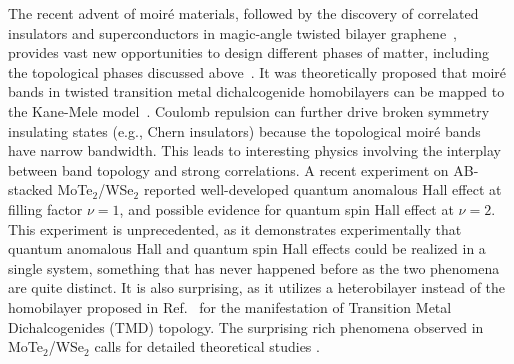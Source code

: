 \documentclass[aps,prl,twocolumn,superscriptaddress,longbibliography]{revtex4-2}
\begin{document}
The recent advent of moir\'e materials, followed by the discovery of correlated insulators and superconductors in magic-angle twisted bilayer graphene~\cite{cao2018correlated,cao2018unconventional}, provides vast new opportunities to design different phases of matter, including the topological phases discussed above~\cite{yankowitz2019tuning,chen2019evidence,cao2020tunable,chen2020electrically,wong2020cascade,serlin2020intrinsic,sharpe2019emergent,lu2019superconductors,shen2020correlated,choi2019electronic,xie2019spectroscopic,chen2019signatures,chen2020tunable,liu2020tunable}. It was theoretically proposed \cite{wu2019topological} that moir\'e bands in twisted transition metal dichalcogenide homobilayers can be mapped to the Kane-Mele model~\cite{wu2019topological,pan2020band,devakul2021magic}. Coulomb repulsion can further drive broken symmetry insulating states (e.g., Chern insulators) because the topological moir\'e bands have narrow bandwidth. This leads to interesting physics involving the interplay between band topology and strong correlations. %
A recent experiment on AB-stacked MoTe$_2$/WSe$_2$ \cite{li2021quantum} reported well-developed quantum anomalous Hall effect at filling factor $\nu=1$, and possible evidence for quantum spin Hall effect at $\nu=2$. This experiment is unprecedented, as it demonstrates experimentally that quantum anomalous Hall and quantum spin Hall effects could be realized in a single system, something that has never happened before as the two phenomena are quite distinct. It is also surprising, as it utilizes a heterobilayer instead of the homobilayer proposed in Ref.~ for the manifestation of Transition Metal Dichalcogenides (TMD) topology. The surprising rich phenomena observed in MoTe$_2$/WSe$_2$ calls for detailed theoretical studies \cite{xie2022valleypolarized,zhang2021spintextured,devakul2021quantum}.
\end{document}
